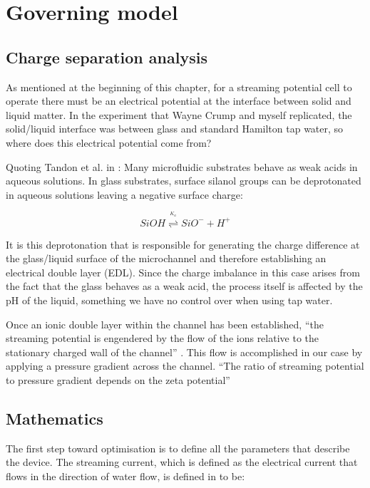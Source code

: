 \section{Governing model}


\subsection{Charge separation analysis}

As mentioned at the beginning of this chapter, for a streaming potential cell
to operate there must be an electrical potential at the interface between solid
and liquid matter. In the experiment that Wayne Crump and myself replicated,
the solid/liquid interface was between glass and standard Hamilton tap water,
so where does this electrical potential come from?

Quoting Tandon et al. in \cite{Tandon2008}: Many microfluidic substrates behave
as weak acids in aqueous solutions. In glass substrates, surface silanol groups
can be deprotonated in aqueous solutions leaving a negative surface charge:

\begin{equation}
    SiOH\overset{^{K_{a}}}{\mathbf{\rightleftharpoons}}SiO^{-}+H^{+}
\end{equation}


It is this deprotonation that is responsible for generating the charge
difference at the glass/liquid surface of the microchannel and therefore
establishing an electrical double layer (EDL). Since the charge imbalance in
this case arises from the fact that the glass behaves as a weak acid, the
process itself is affected by the pH of the liquid, something we have no
control over when using tap water.

Once an ionic double layer within the channel has been established, ``the
streaming potential is engendered by the flow of the ions relative to the
stationary charged wall of the channel'' \cite{Mansouri2005}.  This flow is
accomplished in our case by applying a pressure gradient across the channel.
``The ratio of streaming potential to pressure gradient depends on the zeta
potential''\cite{Park2009}


\subsection{\label{sub:StreamingCell-Mathematics}Mathematics}

The first step toward optimisation is to define all the parameters that
describe the device. The streaming current, which is defined as the electrical
current that flows in the direction of water flow, is defined in
\cite{Olthuis2005} to be:

